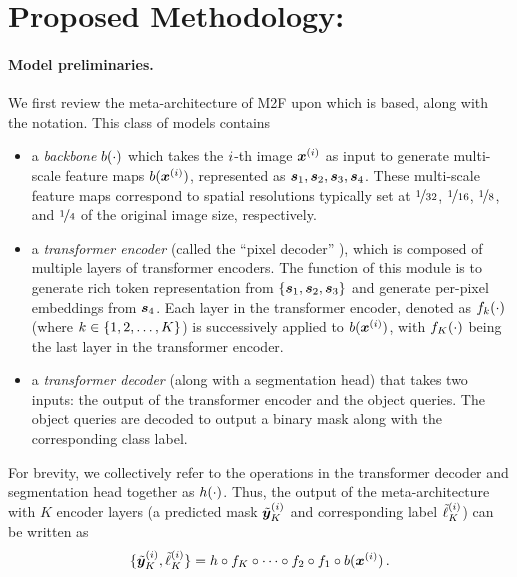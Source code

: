 \section{Proposed Methodology: \ours}
\label{sec:method}

%
\paragraph{Model preliminaries.} We first review the meta-architecture of M2F \cite{cheng2021mask2former} upon which {\ours} is based, along with the notation. This class of models contains
\begin{itemize}
    \item a \emph{backbone} $b(\cdot)$ which takes the $i$-th image ${\bm{x}}^{(i)}$ as input to generate multi-scale feature maps $b({\bm{x}}^{(i)})$, represented as ${\bm{s}_1, \bm{s}_2, \bm{s}_3, \bm{s}_4}$. These multi-scale feature maps correspond to spatial resolutions typically set at $\nicefrac{1}{32}$, $\nicefrac{1}{16}$, $\nicefrac{1}{8}$, and $\nicefrac{1}{4}$ of the original image size, respectively.
    \item a \emph{transformer encoder} (called the ``pixel decoder'' \cite{cheng2021mask2former}), which is composed of multiple layers of transformer encoders. The function of this module is to generate rich token representation from $\{\bm{s}_1, \bm{s}_2, \bm{s}_3\}$ and generate per-pixel embeddings from $\bm{s}_4$. Each layer in the transformer encoder, denoted as $f_k(\cdot)$ (where $k\in\{1,2,\dots,K\}$) is successively applied to $b({\bm{x}}^{(i)})$, with $f_K(\cdot)$ being the last layer in the transformer encoder. 
    \item a \emph{transformer decoder} (along with a segmentation head) that takes two inputs: the output of the transformer encoder and the object queries. The object queries are decoded to output a binary mask along with the corresponding class label. 
\end{itemize}
For brevity, we collectively refer to the operations in the transformer decoder and segmentation head together as $h(\cdot)$. Thus, the output of the meta-architecture with $K$ encoder layers (a predicted mask $\tilde{\bm{y}}_K^{(i)}$ and corresponding label $\tilde{\ell}_K^{(i)}$) can be written as 
\begin{equation}
    \{\tilde{\bm{y}}_K^{(i)}, \tilde{\ell}_K^{(i)}\} = h\circ f_K\circ\cdots\circ f_2\circ f_1\circ b({\bm{x}}^{(i)})\,.
\end{equation}
